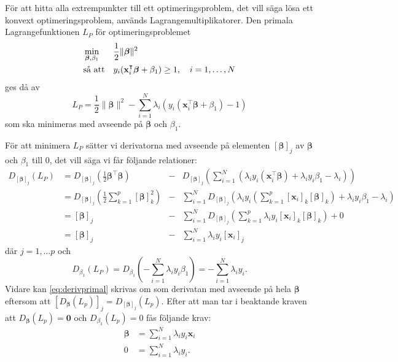 \documentclass[a4paper, 12pt]{report}
\theoremstyle{definition}
\theoremstyle{remark}
\newcommand{\bfbeta}{{\boldsymbol{\beta}}}
\begin{document}
För att hitta alla extrempunkter till ett optimeringsproblem, det vill säga lösa ett konvext optimeringsproblem, används Lagrangemultiplikatorer.
Den primala Lagrangefunktionen $L_P$ för optimeringsproblemet
\begin{equation*}
\begin{aligned}
& \operatornamewithlimits{min}_{\bfbeta,\beta_1} & & \frac{1}{2}\|\bfbeta\|^2\\
& \text{så att} & & y_i(\mathbf{x}_i^\intercal\bfbeta+\beta_1)\geq 1,\quad i=1,\dots,N
\end{aligned}
\end{equation*}
ges då av
\begin{equation}\label{eq:primallagrange}
L_P=\frac{1}{2}\|\bfbeta\|^2 - \sum_{i=1}^{N} \lambda_i\left(y_i \left(\mathbf{x}_i^\intercal\bfbeta + \beta_1\right)-1\right)
\end{equation}
som ska minimeras med avseende på $\bfbeta$ och $\beta_1$.

För att minimera $L_P$ sätter vi derivatorna med avseende på elementen $\left[\bfbeta\right]_j$ av $\bfbeta$ och $\beta_1$ till 0, det vill säga vi får följande relationer:
\begin{equation}\label{eq:derivprimal}
\begin{aligned}
	D_{ \left[\bfbeta\right]_j } (L_P) &= D_{ \left[\bfbeta\right]_j } \left( \frac{1}{2} \bfbeta^\intercal \bfbeta \right) &- &D_{ \left[\bfbeta\right]_j } \left( \sum_{i=1}^{N} \left( \lambda_i y_i \left( \mathbf{x}_i^\intercal\bfbeta \right) + \lambda_i y_i \beta_1 - \lambda_i \right)\right)\\
	&= D_{ \left[\bfbeta\right]_j } \left( \frac{1}{2} \sum_{k=1}^{p} \left[\bfbeta\right]_k^2 \right) &- &\sum_{i=1}^{N} D_{ \left[\bfbeta\right]_j } \left(  \lambda_i y_i \left(\sum_{k=1}^{p}\left[\mathbf{x}_i\right]_k\left[\bfbeta\right]_k \right) + \lambda_i y_i \beta_1-\lambda_i \right)\\
	&= [\bfbeta]_j &- &\sum_{i=1}^{N} D_{ \left[\bfbeta\right]_j } \left( \sum_{k=1}^{p} \lambda_i y_i \left[\mathbf{x}_i\right]_k\left[\bfbeta\right]_k \right) + 0\\
	&= [\bfbeta]_j &- &\sum_{i=1}^{N}\lambda_i y_i \left[ \mathbf{x}_i \right]_j
\end{aligned}
\end{equation}
där $j=1,\dots p$ och
\begin{equation*}
	D_{\beta_1}(L_P) = D_{\beta_1}\left( -\sum_{i=1}^{N} \lambda_i y_i \beta_1 \right) = -\sum_{i=1}^{N} \lambda_i y_i.
\end{equation*}
Vidare kan \ref{eq:derivprimal} skrivas om som derivatan med avseende på hela $\bfbeta$ eftersom att $ \left[ D_{ \bfbeta }(L_p) \right]_j = D_{\left[ \bfbeta \right]_j}(L_p) $. Efter att man tar i beaktande kraven att $ D_{ \bfbeta }(L_p) = \mathbf{0} $ och $ D_{\beta_1}(L_p)=0 $ fås följande krav:
\begin{align}\label{eq:krav1}
	\bfbeta &= \sum_{i=1}^{N} \lambda_i y_i \mathbf{x}_i\\
	0 &= \sum_{i=1}^{N} \lambda_i y_i.\label{eq:krav2}
\end{align}
\end{document}
